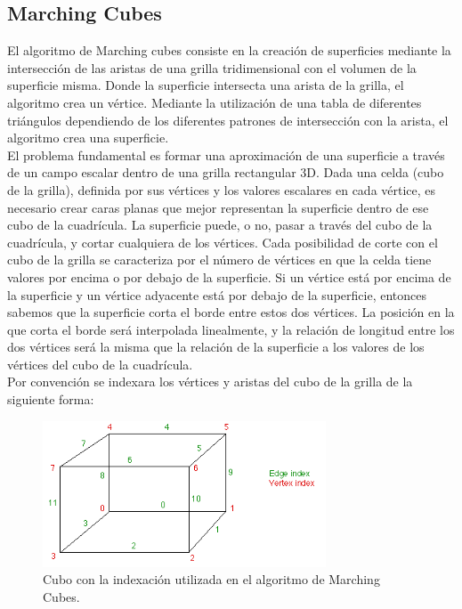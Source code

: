 \documentclass[12pt]{article}
\begin{document}
\subsection{Marching Cubes}
El algoritmo de Marching cubes\cite{marching}\cite{marchingcubes} consiste en la creación de superficies mediante la intersección de las aristas de una grilla tridimensional con el volumen de la superficie misma. Donde la superficie intersecta una arista de la grilla, el algoritmo crea un vértice. Mediante la utilización de una tabla de diferentes triángulos dependiendo de los diferentes patrones de intersección con la arista, el algoritmo crea una superficie.
\\El problema fundamental es formar una aproximación de una superficie a través de un campo escalar dentro de una grilla rectangular 3D. Dada una celda (cubo de la grilla), definida por sus vértices y los valores escalares en cada vértice, es necesario crear caras planas que mejor representan la superficie dentro de ese cubo de la cuadrícula. La superficie puede, o no, pasar a través del cubo de la cuadrícula, y cortar cualquiera de los vértices. Cada posibilidad de corte con el cubo de la grilla se caracteriza por el número de vértices en que la celda tiene valores por encima o por debajo de la superficie. Si un vértice está por encima de la superficie y un vértice adyacente está por debajo de la superficie, entonces sabemos que la superficie corta el borde entre estos dos vértices. La posición en la que corta el borde será interpolada linealmente, y la relación de longitud entre los dos vértices será la misma que la relación de la superficie a los valores de los vértices del cubo de la cuadrícula.
\\Por convención se indexara los vértices y aristas del cubo de la grilla de la siguiente forma:
\begin{figure}[h!]
\includegraphics[width=0.75\textwidth,center]{marchingcubes1.png}
\caption{Cubo con la indexación utilizada en el algoritmo de Marching Cubes.}
\end{figure}
\end{document}
